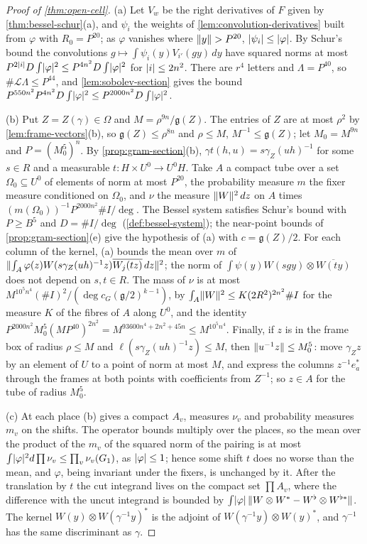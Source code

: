 \begin{proof}[Proof of \cref{thm:open-cell}]
(a) Let $V_w$ be the right derivatives of $F$ given by \cref{thm:bessel-schur}(a), and $\psi_i$ the weights of \cref{lem:convolution-derivatives} built from $\varphi$ with $R_0=P^{20}$; as $\varphi$ vanishes where $\lVert y\rVert>P^{20}$, $\lvert \psi_i\rvert\le\lvert \varphi\rvert$. By Schur's
bound the convolutions $g\mapsto\int\psi_i(y)V_{i'}(gy)\,dy$ have squared norms at most $P^{2\lvert i\rvert}D\int\lvert \varphi\rvert^2\le P^{4n^2}D\int\lvert \varphi\rvert^2$ for $\lvert i\rvert\le2n^2$. There are $r^4$ letters and $\Lambda=P^{40}$, so $\#\mathcal L\Lambda\le P^{44}$, and
\cref{lem:sobolev-section} gives the bound $P^{550n^2}P^{4n^2}D\int\lvert \varphi\rvert^2\le P^{2000n^2}D\int\lvert \varphi\rvert^2$.

(b) Put $Z=Z(\gamma)\in\Omega$ and $M=\rho^{9n}/\mathfrak g(Z)$. The entries of $Z$ are at most $\rho^2$ by \cref{lem:frame-vectors}(b), so $\mathfrak g(Z)\le\rho^{8n}$ and $\rho\le M$, $M^{-1}\le\mathfrak g(Z)$; let $M_0=M^{9n}$ and $P=(M_0^5)^n$. By \cref{prop:gram-section}(b),
$\gamma t(h,u)=s\gamma_Z(uh)^{-1}$ for some $s\in R$ and a measurable $t\colon H\times U^0\to U^0H$. Take $A$ a compact tube over a set $\Omega_0\subseteq U^0$ of elements of norm at most $P^{20}$, the probability measure $m$ the fixer
measure conditioned on $\Omega_0$, and $\nu$ the measure $\lVert W\rVert^2\,dz$ on $A$ times $(m(\Omega_0))^{-1}P^{2000n^2}\#I/\deg$. The Bessel system satisfies Schur's bound with $P\ge B^5$ and $D=\#I/\deg$ (\cref{def:bessel-system}); the near-point bounds
of \cref{prop:gram-section}(e) give the hypothesis of (a) with $c=\mathfrak g(Z)/2$. For each column of the kernel, (a) bounds the mean over $m$ of $\lVert \int_A\varphi(z)W(s\gamma_Z(uh)^{-1}z)\overline{W_j(tz)}\,dz\rVert^2$; the norm of
$\int\psi(y)W(sgy)\otimes\overline{W(ty)}$ does not depend on $s,t\in R$. The mass of $\nu$ is at most $M^{10^5n^4}(\#I)^2/(\deg c_G(\mathfrak g/2)^{k-1})$, by $\int_A\lVert W\rVert^2\le K(2R^2)^{2n^2}\#I$ for the measure $K$ of the fibres of $A$ along $U^0$, and
the identity $P^{2000n^2}M_0^5(MP^{40})^{2n^2}=M^{93600n^4+2n^2+45n}\le M^{10^5n^4}$. Finally, if $z$ is in the frame box of radius $\rho\le M$ and $\ell(s\gamma_Z(uh)^{-1}z)\le M$, then $\lVert u^{-1}z\rVert\le M_0^{5}$: move $\gamma_Zz$ by an element of $U$ to a point of
norm at most $M$, and express the columns $z^{-1}e^*_a$ through the frames at both points with coefficients from $Z^{-1}$; so $z\in A$ for the tube of radius $M_0^5$.

(c) At each place (b) gives a compact $A_v$, measures $\nu_v$ and probability measures $m_v$ on the shifts. The operator bounds multiply over the places, so the mean over the product of the $m_v$ of the squared norm of the
pairing is at most $\int\lvert \varphi\rvert^2d\prod\nu_v\le\prod_v\nu_v(G_1)$, as $\lvert \varphi\rvert\le1$; hence some shift $t$ does no worse than the mean, and $\varphi$, being invariant under the fixers, is unchanged by it. After the translation by $t$ the cut
integrand lives on the compact set $\prod A_v$, where the difference with the uncut integrand is bounded by $\int\lvert \varphi\rvert\,\lVert W\otimes W^*-W^\flat\otimes W^{\flat*}\rVert$. The kernel $W(y)\otimes W(\gamma^{-1}y)^*$ is the adjoint of $W(\gamma^{-1}y)\otimes W(y)^*$, and
$\gamma^{-1}$ has the same discriminant as $\gamma$.
\end{proof}

